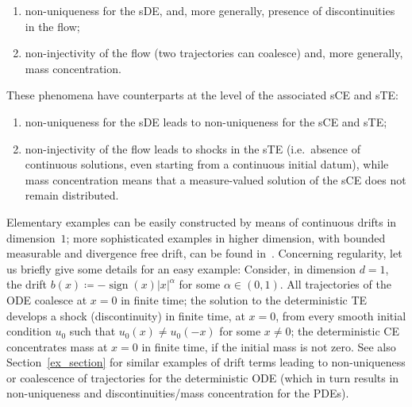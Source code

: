 \documentclass[a4paper,10pt]{article}
\newcommand\1{\mathbbm{1}}
\DeclareMathOperator{\sign}{sign}
\numberwithin{equation}{section}
\begin{document}
\begin{enumerate}
  \item[1)] non-uniqueness for the sDE, and, more generally, presence of discontinuities in the flow;
  \item[2)] non-injectivity of the flow (two trajectories can coalesce) and, more generally, mass concentration.
\end{enumerate}
These phenomena have counterparts at the level of the associated sCE and sTE:
\begin{enumerate}
  \item[1)]  non-uniqueness for the sDE leads to non-uniqueness for the sCE and sTE;
  \item[2)]  non-injectivity of the flow leads to shocks in the sTE (i.e.~absence of continuous solutions, even starting from a continuous initial datum), while mass concentration means that a measure-valued solution of the sCE does not remain distributed.
\end{enumerate}
Elementary examples can be easily constructed by means of continuous drifts in dimension~$1$; more sophisticated examples in higher dimension, with bounded measurable and divergence free drift, can be found in~\cite{AIZENMAN78}. Concerning regularity, let us briefly give some details for an easy example: Consider, in dimension $d=1$, the drift $b(x) \coloneqq - \sign(x) \vert x \vert^{\alpha }$ for some $\alpha \in (0,1)$. All trajectories of the ODE coalesce at $x=0$ in finite time; the solution to the deterministic TE develops a shock (discontinuity) in finite time, at $x=0$, from every smooth initial condition $u_{0}$ such that $u_{0}( x) \neq u_{0}( -x) $ for some $x\neq 0$; the deterministic CE concentrates mass at $x=0$ in finite time, if the initial mass is not zero. See also Section~\ref{ex_section} for similar examples of drift terms leading to non-uniqueness or coalescence of trajectories for the deterministic ODE (which in turn results in non-uniqueness and discontinuities/mass concentration for the PDEs).
\end{document}
